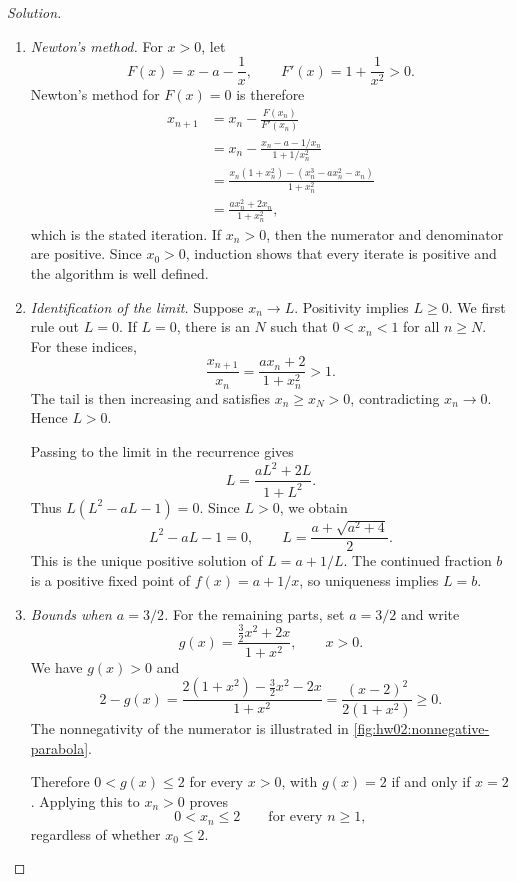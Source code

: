 \begingroup
\renewcommand{\labelenumi}{(\alph{enumi})}
\allowdisplaybreaks[1]

\begin{proof}[Solution]
\leavevmode
\begin{enumerate}
  \item \textit{Newton's method.}
    For $x>0$, let
    \[
      F(x)=x-a-\frac1x,\qquad F'(x)=1+\frac1{x^2}>0.
    \]
    Newton's method for $F(x)=0$ is therefore
    \[
      \begin{aligned}
        x_{n+1}
          &=x_n-\frac{F(x_n)}{F'(x_n)}\\
          &=x_n-\frac{x_n-a-1/x_n}{1+1/x_n^2}\\
          &=\frac{x_n(1+x_n^2)-(x_n^3-ax_n^2-x_n)}{1+x_n^2}\\
          &=\frac{ax_n^2+2x_n}{1+x_n^2},
      \end{aligned}
    \]
    which is the stated iteration. If $x_n>0$, then the numerator
    and denominator are positive. Since $x_0>0$, induction shows
    that every iterate is positive and the algorithm is well defined.

  \item \textit{Identification of the limit.}
    Suppose $x_n\to L$. Positivity implies $L\geq0$.
    We first
    rule out $L=0$. If $L=0$, there is an $N$ such that
    $0<x_n<1$ for all $n\geq N$. For these indices,
    \[
      \frac{x_{n+1}}{x_n}
        =\frac{ax_n+2}{1+x_n^2}>1.
    \]
    The tail is then increasing and satisfies $x_n\geq x_N>0$,
    contradicting $x_n\to0$. Hence $L>0$.

    Passing to the limit in the recurrence gives
    \[
      L=\frac{aL^2+2L}{1+L^2}.
    \]
    Thus $L(L^2-aL-1)=0$. Since $L>0$, we obtain
    \[
      L^2-aL-1=0,\qquad
      L=\frac{a+\sqrt{a^2+4}}2.
    \]
    This is the unique positive solution of $L=a+1/L$.
    The continued fraction $b$ is a positive fixed point of
    $f(x)=a+1/x$, so uniqueness implies $L=b$.

  \item \textit{Bounds when $a=3/2$.}
    For the remaining parts, set $a=3/2$ and write
    \[
      g(x)=\frac{\tfrac32x^2+2x}{1+x^2},\qquad x>0.
    \]
    We have $g(x)>0$ and
    \[
      2-g(x)
        =\frac{2(1+x^2)-\tfrac32x^2-2x}{1+x^2}
        =\frac{(x-2)^2}{2(1+x^2)}\geq0.
    \]
    The nonnegativity of the numerator is illustrated in
    \autoref{fig:hw02:nonnegative-parabola}.
    \begin{marginfigure}[100pt]
      \centering
      
      \caption[A nonnegative quadratic.]{The numerator $(x-2)^2$ is nonnegative,
        with equality only at $x=2$.}
      \label{fig:hw02:nonnegative-parabola}
    \end{marginfigure}
    Therefore $0<g(x)\leq2$ for every $x>0$, with $g(x)=2$
    if and only if $x=2$. Applying this to $x_n>0$ proves
    \[
      0<x_n\leq2\qquad\text{for every }n\geq1,
    \]
    regardless of whether $x_0\leq2$.


\end{enumerate}
\end{proof}
